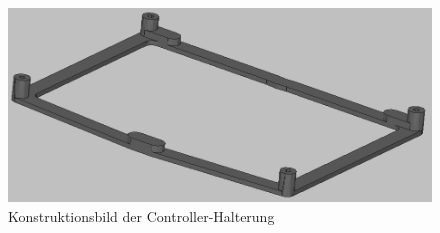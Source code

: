 \begin{figure}[H] %
\includegraphics[width=.85\textwidth]{sec2/images/3DAnbaukomponenten/Konstruktionsbilder/ControllerHalterungKonstruktion} 
\centering
\captionsetup{width=.9\textwidth}
\caption[Konstruktionsbild der Controller-Halterung]{Konstruktionsbild der Controller-Halterung}
\centering
\label{fig:ControllerHalterungKonstruktion}
\end{figure}

